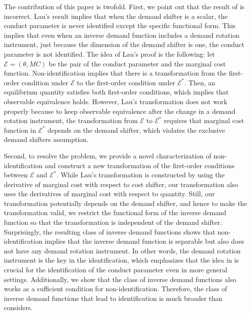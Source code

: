 \documentclass[11pt, a4paper]{article}
\theoremstyle{remark}
\begin{document}
The contribution of this paper is twofold.
First, we point out that the result of \citet{lau1982identifying} is incorrect.
Lau's result implies that when the demand shifter is a scalar, the conduct parameter is never identified except the specific functional form.
This implies that even when an inverse demand function includes a demand rotation instrument, just because the dimension of the demand shifter is one, the conduct parameter is not identified.
The idea of Lau's proof is the following: let $\mathcal{E} = (\theta, MC)$ be the pair of the conduct parameter and the marginal cost function.
Non-identification implies that there is a transformation from the first-order condition under $\mathcal{E}$ to the first-order condition under $\mathcal{E}^{*}$.
Then, an equilibrium quantity satisfies both first-order conditions, which implies that observable equivalence holds.
However, Lau's transformation does not work properly because to keep observable equivalence after the change in a demand rotation instrument, the transformation from $\mathcal{E}$ to $\mathcal{E}^{*}$ requires that marginal cost function in $\mathcal{E}^{*}$ depends on the demand shifter, which violates the exclusive demand shifters assumption.

Second, to resolve the problem, we provide a novel characterization of non-identification and construct a new transformation of the first-order conditions between $\mathcal{E}$ and $\mathcal{E}^{*}$.
While Lau's transformation is constructed by using the derivative of marginal cost with respect to cost shifter, our transformation also uses the derivatives of marginal cost with respect to quantity.
Still, our transformation potentially depends on the demand shifter, and hence to make the transformation valid, we restrict the functional form of the inverse demand function so that the transformation is independent of the demand shifter.
Surprisingly, the resulting class of inverse demand functions shows that non-identification implies that the inverse demand function is separable but also does not have any demand rotation instrument.
In other words, the demand rotation instrument is the key in the identification, which emphasizes that the idea in \citet{bresnahan1982oligopoly} is crucial for the identification of the conduct parameter even in more general settings. 
Additionally, we show that the class of inverse demand functions also works as a sufficient condition for non-identification.
Therefore, the class of inverse demand functions that lead to identification is much broader than \citet{lau1982identifying} considers.
\end{document}
